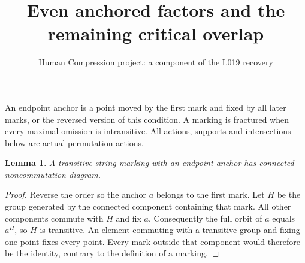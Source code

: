 \documentclass[11pt,a4paper]{article}
\title{Even anchored factors and the remaining critical overlap}
\author{Human Compression project: a component of the L019 recovery}
\date{}
\newtheorem{lemma}{Lemma}
\begin{document}
\maketitle
An endpoint anchor is a point moved by the first mark and fixed by
all later marks, or the reversed version of this condition. A marking
is fractured when every maximal omission is intransitive. All actions,
supports and intersections below are actual permutation actions.

\begin{lemma}\label{connected}
A transitive string marking with an endpoint anchor has connected
noncommutation diagram.
\end{lemma}
\begin{proof}
Reverse the order so the anchor $a$ belongs to the first mark.
Let $H$ be the group generated by the connected component containing
that mark. All other components commute with $H$ and fix $a$.
Consequently the full orbit of $a$ equals $a^H$, so $H$ is transitive.
An element commuting with a transitive group and fixing one point
fixes every point. Every mark outside that component would therefore
be the identity, contrary to the definition of a marking.
\end{proof}
\end{document}
